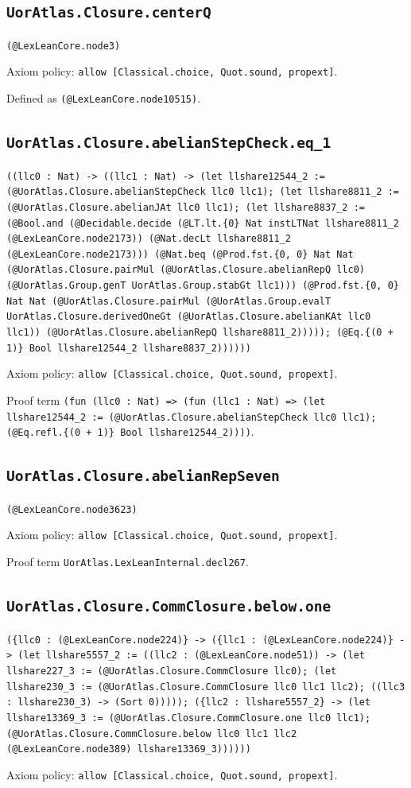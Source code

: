 \documentclass[11pt]{article}
\begin{document}
\subsection*{\texttt{UorAtlas.Closure.centerQ}}
\noindent\texttt{(@LexLeanCore.node3)}\par
\noindent Axiom policy: \texttt{allow [Classical.choice, Quot.sound, propext]}.\par
\noindent Defined as \texttt{(@LexLeanCore.node10515)}.\par
\subsection*{\texttt{UorAtlas.Closure.abelianStepCheck.eq\_1}}
\noindent\texttt{((llc0 : Nat) -> ((llc1 : Nat) -> (let llshare12544\_2 := (@UorAtlas.Closure.abelianStepCheck llc0 llc1); (let llshare8811\_2 := (@UorAtlas.Closure.abelianJAt llc0 llc1); (let llshare8837\_2 := (@Bool.and (@Decidable.decide (@LT.lt.\{0\} Nat instLTNat llshare8811\_2 (@LexLeanCore.node2173)) (@Nat.decLt llshare8811\_2 (@LexLeanCore.node2173))) (@Nat.beq (@Prod.fst.\{0, 0\} Nat Nat (@UorAtlas.Closure.pairMul (@UorAtlas.Closure.abelianRepQ llc0) (@UorAtlas.Group.genT UorAtlas.Group.stabGt llc1))) (@Prod.fst.\{0, 0\} Nat Nat (@UorAtlas.Closure.pairMul (@UorAtlas.Group.evalT UorAtlas.Closure.derivedOneGt (@UorAtlas.Closure.abelianKAt llc0 llc1)) (@UorAtlas.Closure.abelianRepQ llshare8811\_2))))); (@Eq.\{(0 + 1)\} Bool llshare12544\_2 llshare8837\_2))))))}\par
\noindent Axiom policy: \texttt{allow [Classical.choice, Quot.sound, propext]}.\par
\noindent Proof term \texttt{(fun (llc0 : Nat) => (fun (llc1 : Nat) => (let llshare12544\_2 := (@UorAtlas.Closure.abelianStepCheck llc0 llc1); (@Eq.refl.\{(0 + 1)\} Bool llshare12544\_2))))}.\par
\subsection*{\texttt{UorAtlas.Closure.abelianRepSeven}}
\noindent\texttt{(@LexLeanCore.node3623)}\par
\noindent Axiom policy: \texttt{allow [Classical.choice, Quot.sound, propext]}.\par
\noindent Proof term \texttt{UorAtlas.LexLeanInternal.decl267}.\par
\subsection*{\texttt{UorAtlas.Closure.CommClosure.below.one}}
\noindent\texttt{(\{llc0 : (@LexLeanCore.node224)\} -> (\{llc1 : (@LexLeanCore.node224)\} -> (let llshare5557\_2 := ((llc2 : (@LexLeanCore.node51)) -> (let llshare227\_3 := (@UorAtlas.Closure.CommClosure llc0); (let llshare230\_3 := (@UorAtlas.Closure.CommClosure llc0 llc1 llc2); ((llc3 : llshare230\_3) -> (Sort 0))))); (\{llc2 : llshare5557\_2\} -> (let llshare13369\_3 := (@UorAtlas.Closure.CommClosure.one llc0 llc1); (@UorAtlas.Closure.CommClosure.below llc0 llc1 llc2 (@LexLeanCore.node389) llshare13369\_3))))))}\par
\noindent Axiom policy: \texttt{allow [Classical.choice, Quot.sound, propext]}.\par
\end{document}
